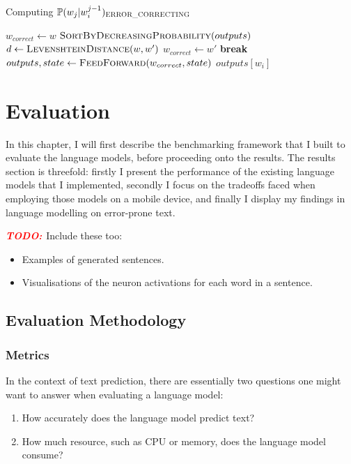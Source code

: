 \documentclass[a4paper, 12pt]{report}
\newcommand{\todo}{\textbf{\textit{\textcolor{red}{TODO: }}}}
\begin{document}
\begin{algorithm}
\caption{Computing $\mathbb{P}(w_j | w_i^{j - 1})_{\text{\scshape ERROR\_CORRECTING}}$}
\label{alg:error_correction}
\begin{algorithmic}[1]
	\State $w_{correct} \gets w$
		\State $\text{\scshape SortByDecreasingProbability}(outputs)$
			\State $d \gets \text{\scshape LevenshteinDistance}(w, w')$
				\State $w_{correct} \gets w'$
				\State \textbf{break}
			\EndIf
		\EndFor
	\EndIf
	\State $outputs, state \gets \text{\scshape FeedForward}(w_{correct}, state)$
\EndFor
\State \Return $outputs[w_i]$
\EndProcedure
\end{algorithmic}
\end{algorithm}

\chapter{Evaluation} \label{evaluation}

In this chapter, I will first describe the benchmarking framework that I built to evaluate the language models, before proceeding onto the results. The results section is threefold: firstly I present the performance of the existing language models that I implemented, secondly I focus on the tradeoffs faced when employing those models on a mobile device, and finally I display my findings in language modelling on error-prone text.

\todo{Include these too:}
\begin{itemize}
\item
	Examples of generated sentences.
\item
	Visualisations of the neuron activations for each word in a sentence.
\end{itemize}

\section{Evaluation Methodology}

\subsection{Metrics} \label{metrics}

In the context of text prediction, there are essentially two questions one might want to answer when evaluating a language model:
\begin{enumerate}
\item
	How accurately does the language model predict text?
\item
	How much resource, such as CPU or memory, does the language model consume?
\end{enumerate}
\end{document}
